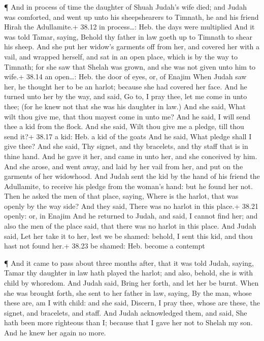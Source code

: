  ¶ And in process of time the daughter of Shuah Judah's
wife died; and Judah was comforted, and went up unto his sheepshearers
to Timnath, he and his friend Hirah the Adullamite.+ 38.12 in
process\ldots: Heb. the days were multiplied  And it was
told Tamar, saying, Behold thy father in law goeth up to Timnath to
shear his sheep.  And she put her widow's garments off from
her, and covered her with a vail, and wrapped herself, and sat in an
open place, which is by the way to Timnath; for she saw that Shelah was
grown, and she was not given unto him to wife.+ 38.14 an open\ldots:
Heb. the door of eyes, or, of Enajim  When Judah saw her,
he thought her to be an harlot; because she had covered her face.
 And he turned unto her by the way, and said, Go to, I pray
thee, let me come in unto thee; (for he knew not that she was his
daughter in law.) And she said, What wilt thou give me, that thou mayest
come in unto me?  And he said, I will send thee a kid from
the flock. And she said, Wilt thou give me a pledge, till thou send it?+
38.17 a kid: Heb. a kid of the goats  And he said, What
pledge shall I give thee? And she said, Thy signet, and thy bracelets,
and thy staff that is in thine hand. And he gave it her, and came in
unto her, and she conceived by him.  And she arose, and
went away, and laid by her vail from her, and put on the garments of her
widowhood.  And Judah sent the kid by the hand of his
friend the Adullamite, to receive his pledge from the woman's hand: but
he found her not.  Then he asked the men of that place,
saying, Where is the harlot, that was openly by the way side? And they
said, There was no harlot in this place.+ 38.21 openly: or, in Enajim
 And he returned to Judah, and said, I cannot find her; and
also the men of the place said, that there was no harlot in this place.
 And Judah said, Let her take it to her, lest we be shamed:
behold, I sent this kid, and thou hast not found her.+ 38.23 be shamed:
Heb. become a contempt

 ¶ And it came to pass about three months after, that it
was told Judah, saying, Tamar thy daughter in law hath played the
harlot; and also, behold, she is with child by whoredom. And Judah said,
Bring her forth, and let her be burnt.  When she was
brought forth, she sent to her father in law, saying, By the man, whose
these are, am I with child: and she said, Discern, I pray thee, whose
are these, the signet, and bracelets, and staff.  And Judah
acknowledged them, and said, She hath been more righteous than I;
because that I gave her not to Shelah my son. And he knew her again no
more.

